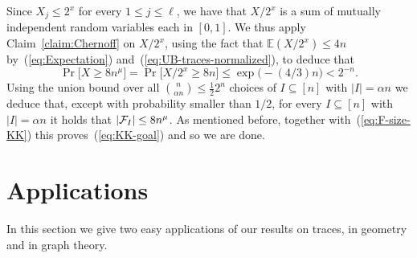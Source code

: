 \documentclass[11pt]{article}
\newcommand{\FF}{{\cal F}}
\renewcommand{\a}{\alpha}
\newcommand{\sub}{\subseteq}
\newcommand{\Ex}{\mathbb{E}}
\newcommand{\C}{\mu}
\begin{document}
Since $X_j \le 2^x$ for every $1 \le j \le \ell$, 
we have that $X/2^x$ is a sum of mutually independent random variables each in $[0,1]$.
We thus apply Claim~\ref{claim:Chernoff} on $X/2^x$, using the fact that $\Ex(X/2^x) \le 4n$ by~(\ref{eq:Expectation}) and~(\ref{eq:UB-traces-normalized}), to deduce that
$$\Pr\big[X \ge 8 n^\C \big] = \Pr\big[X/2^x \ge 8n \big] \le \exp\big(-(4/3)n\big) < 2^{-n}.$$
Using the union bound over all $\binom{n}{\a n} \le \frac12 2^n$ choices of $I \sub [n]$ with $|I|=\a n$ we deduce 
that, except with probability smaller than $1/2$, for every $I \sub [n]$ with $|I|=\a n$ it holds that $|\FF_I| \le 8n^\C$. As mentioned before, together with~(\ref{eq:F-size-KK}) this proves~(\ref{eq:KK-goal}) and so we are done.


%



\section{Applications}\label{sec:applications}

In this section we give two easy applications of our results on traces, in geometry and in graph theory.
\end{document}
